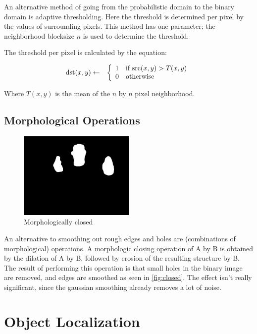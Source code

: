 An alternative method of going from the probabilistic domain to the binary domain is adaptive thresholding. Here the threshold is determined per pixel by the values of surrounding pixels. This method has one parameter; the neighborhood blocksize $n$ is used to determine the threshold.

The threshold per pixel is calculated by the equation:

\begin{eqnarray}
  \text{dst}(x, y) & \leftarrow & \left\{
  \begin{array}{l l}
	1 & \text{if src}(x,y) > T(x,y) \\
	0 & \text{otherwise} \\
  \end{array} \right.
\end{eqnarray}

Where $T(x,y)$ is the mean of the $n$ by $n$ pixel neighborhood.

\subsection*{Morphological Operations}

\begin{figure}[htbp]
    \center{}
    \includegraphics[width=0.5\textwidth]{figures/pipeline/closed.jpg}
	\caption{Morphologically closed}
	\label{fig:closed}
\end{figure}

An alternative to smoothing out rough edges and holes are (combinations of morphological) operations.  A morphologic closing operation of A by B is obtained by the dilation of A by B, followed by erosion of the resulting structure by B. The result of performing this operation is that small holes in the binary image are removed, and edges are smoothed as seen in \autoref{fig:closed}. The effect isn't really significant, since the gaussian smoothing already removes a lot of noise. 


\section{Object Localization}

